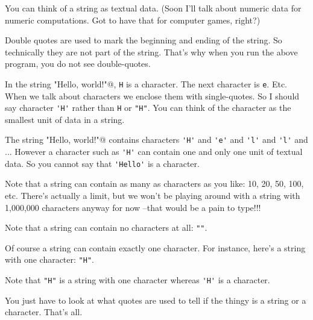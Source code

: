 You can think of a string as textual data. (Soon I'll talk about numeric data for numeric computations. Got to have that for computer games, right?)

Double quotes are used to mark the beginning and ending of the string. So technically they are not part of the string. That's why when you run the above program, you do not see double-quotes.



In the string 
\verb@"Hello, world!\n"@, \verb!H! is a character. The next character is \verb!e!. Etc. When we talk about characters we enclose them with single-quotes. So I should say character \verb!'H'! rather than \verb!H! or \verb!"H"!. 
You can think of the character as the smallest unit of data in a string. 

The string \verb@"Hello, world!\n"@ contains characters \verb!'H'! and \verb!'e'! and \verb!'l'! and \verb!'l'! and ... However a character such as \verb!'H'! can contain one and only one unit of textual data. So you cannot say that \verb!'Hello'! is a character. 

Note that a string can contain as many as characters as you like: 10, 20, 50, 100, etc. 
There's actually a limit, but we won't be playing around with a string with 1,000,000 characters anyway for now --that would be a pain to type!!! 

Note that a string can contain no characters at all: \verb!""!. 

Of course a string can contain exactly one character. 
For instance, here's a string with one character: \verb!"H"!. 

Note that \verb!"H"! is a string with one character whereas \verb!'H'! is a character. 

You just have to look at what quotes are used to tell if the thingy is a string or a character. That's all.






